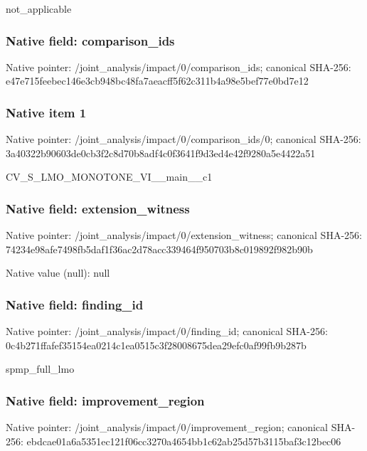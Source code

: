 \documentclass[10pt,a4paper]{article}
\begin{document}
\begingroup\raggedright\sloppy not\_\allowbreak{}applicable\par\endgroup

\subsubsection{Native field: comparison\_\allowbreak{}ids}
Native pointer: /joint\_\allowbreak{}analysis/impact/0/comparison\_\allowbreak{}ids; canonical SHA-256: e47e715feebec146e3cb948bc48fa7aeacff5f62c311b4a98e5bef77e0bd7e12

\subsubsection{Native item 1}
Native pointer: /joint\_\allowbreak{}analysis/impact/0/comparison\_\allowbreak{}ids/0; canonical SHA-256: 3a40322b90603de0cb3f2c8d70b8adf4c0f3641f9d3ed4e42f9280a5e4422a51

\begingroup\raggedright\sloppy CV\_\allowbreak{}S\_\allowbreak{}LMO\_\allowbreak{}MONOTONE\_\allowbreak{}VI\_\allowbreak{}\_\allowbreak{}main\_\allowbreak{}\_\allowbreak{}c1\par\endgroup

\subsubsection{Native field: extension\_\allowbreak{}witness}
Native pointer: /joint\_\allowbreak{}analysis/impact/0/extension\_\allowbreak{}witness; canonical SHA-256: 74234e98afe7498fb5daf1f36ac2d78acc339464f950703b8c019892f982b90b

Native value (null): null

\subsubsection{Native field: finding\_\allowbreak{}id}
Native pointer: /joint\_\allowbreak{}analysis/impact/0/finding\_\allowbreak{}id; canonical SHA-256: 0c4b271ffafef35154ea0214c1ea0515c3f28008675dea29efc0af99fb9b287b

\begingroup\raggedright\sloppy spmp\_\allowbreak{}full\_\allowbreak{}lmo\par\endgroup

\subsubsection{Native field: improvement\_\allowbreak{}region}
Native pointer: /joint\_\allowbreak{}analysis/impact/0/improvement\_\allowbreak{}region; canonical SHA-256: ebdcae01a6a5351ec121f06cc3270a4654bb1c62ab25d57b3115baf3c12bec06
\end{document}

